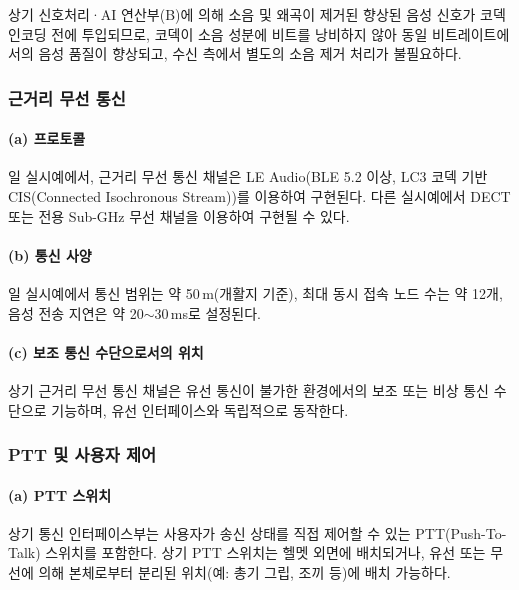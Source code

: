 \documentclass{article}
\begin{document}
상기 신호처리·AI 연산부(B)에 의해 소음 및 왜곡이 제거된 향상된 음성 신호가 코덱 인코딩 전에 투입되므로, 코덱이 소음 성분에 비트를 낭비하지 않아 동일 비트레이트에서의 음성 품질이 향상되고, 수신 측에서 별도의 소음 제거 처리가 불필요하다.

\subsubsection{근거리 무선 통신}

\paragraph{(a) 프로토콜}

일 실시예에서, 근거리 무선 통신 채널은 LE Audio(BLE 5.2 이상, LC3 코덱 기반 CIS(Connected Isochronous Stream))를 이용하여 구현된다. 다른 실시예에서 DECT 또는 전용 Sub-GHz 무선 채널을 이용하여 구현될 수 있다.

\paragraph{(b) 통신 사양}

일 실시예에서 통신 범위는 약 50\,m(개활지 기준), 최대 동시 접속 노드 수는 약 12개, 음성 전송 지연은 약 20$\sim$30\,ms로 설정된다.

\paragraph{(c) 보조 통신 수단으로서의 위치}

상기 근거리 무선 통신 채널은 유선 통신이 불가한 환경에서의 보조 또는 비상 통신 수단으로 기능하며, 유선 인터페이스와 독립적으로 동작한다.

\subsubsection{PTT 및 사용자 제어}

\paragraph{(a) PTT 스위치}

상기 통신 인터페이스부는 사용자가 송신 상태를 직접 제어할 수 있는 PTT(Push-To-Talk) 스위치를 포함한다. 상기 PTT 스위치는 헬멧 외면에 배치되거나, 유선 또는 무선에 의해 본체로부터 분리된 위치(예: 총기 그립, 조끼 등)에 배치 가능하다.
\end{document}
